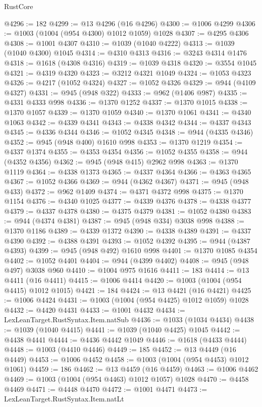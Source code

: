 \begin{lexlean}{RustCore}
\begin{coremodule}
@4296 := 182
@4299 := @13 @4296 (@16 @4296)
@4300 := @1006 @4299
@4306 := @1003 (@1004 (@954 @4300) @1012 @1059) @1028
@4307 := @4295 @4306
@4308 := @1001 @4307
@4310 := @1039 (@1040 @4222)
@4313 := @1039 (@1040 @4300) @1045
@4314 := @4310 @4313
@4316 := @3243 @4314 @1476
@4318 := @1618 (@4308 @4316)
@4319 := @1039 @4318
@4320 := @3554 @1045
@4321 := @4319 @4320
@4323 := @3212 @4321 @1049
@4324 := @1053 @4323
@4326 := @4217 (@1052 @4324)
@4327 := @1052 @4326
@4329 := @944 (@4109 @4327)
@4331 := @945 (@948 @322)
@4333 := @962 (@1406 @987)
@4335 := @4331 @4333 @998
@4336 := @1370 @1252
@4337 := @1370 @1015
@4338 := @1370 @1057
@4339 := @1370 @1059
@4340 := @1370 @1061
@4341 := @4340 @1063
@4342 := @4339 @4341
@4343 := @4338 @4342
@4344 := @4337 @4343
@4345 := @4336 @4344
@4346 := @1052 @4345
@4348 := @944 (@4335 @4346)
@4352 := @945 (@948 @400) @1610 @998
@4353 := @1370 @1219
@4354 := @4337 @1374
@4355 := @4353 @4354
@4356 := @1052 @4355
@4358 := @944 (@4352 @4356)
@4362 := @945 (@948 @415) @2962 @998
@4363 := @1370 @1119
@4364 := @4338 @1373
@4365 := @4337 @4364
@4366 := @4363 @4365
@4367 := @1052 @4366
@4369 := @944 (@4362 @4367)
@4371 := @945 (@948 @433)
@4372 := @962 @1409
@4374 := @4371 @4372 @998
@4375 := @1370 @1154
@4376 := @4340 @1025
@4377 := @4339 @4376
@4378 := @4338 @4377
@4379 := @4337 @4378
@4380 := @4375 @4379
@4381 := @1052 @4380
@4383 := @944 (@4374 @4381)
@4387 := @945 (@948 @334) @3038 @998
@4388 := @1370 @1186
@4389 := @4339 @1372
@4390 := @4338 @4389
@4391 := @4337 @4390
@4392 := @4388 @4391
@4393 := @1052 @4392
@4395 := @944 (@4387 @4393)
@4399 := @945 (@948 @492) @1610 @998
@4401 := @1370 @1085 @4354
@4402 := @1052 @4401
@4404 := @944 (@4399 @4402)
@4408 := @945 (@948 @497) @3038 @960
@4410 := @1004 @975 @1616
@4411 := 183
@4414 := @13 @4411 (@16 @4411)
@4415 := @1006 @4414
@4420 := @1003 (@1004 (@954 @4415) @1012 @1015)
@4421 := 184
@4424 := @13 @4421 (@16 @4421)
@4425 := @1006 @4424
@4431 := @1003 (@1004 (@954 @4425) @1012 @1059) @1028
@4432 := @4420 @4431
@4433 := @1001 @4432
@4434 := LexLeanTarget.RustSyntax.Item.natSub
@4436 := @1033 (@1034 @4434)
@4438 := @1039 (@1040 @4415)
@4441 := @1039 (@1040 @4425) @1045
@4442 := @4438 @4441
@4444 := @4436 @4442 @1049
@4446 := @1618 (@4433 @4444)
@4448 := @1003 (@4410 @4446)
@4449 := 185
@4452 := @13 @4449 (@16 @4449)
@4453 := @1006 @4452
@4458 := @1003 (@1004 (@954 @4453) @1012 @1061)
@4459 := 186
@4462 := @13 @4459 (@16 @4459)
@4463 := @1006 @4462
@4469 := @1003 (@1004 (@954 @4463) @1012 @1057) @1028
@4470 := @4458 @4469
@4471 := @4448 @4470
@4472 := @1001 @4471
@4473 := LexLeanTarget.RustSyntax.Item.natLt

\end{coremodule}
\end{lexlean}
